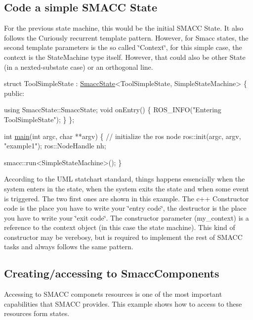 \subsection*{Code a simple S\+M\+A\+CC State}

For the previous state machine, this would be the initial S\+M\+A\+CC State. It also follows the Curiously recurrent template pattern. However, for Smacc states, the second template parameters is the so called \char`\"{}\+Context\char`\"{}, for this simple case, the context is the State\+Machine type itself. However, that could also be other State (in a nexted-\/substate case) or an orthogonal line.


\begin{DoxyCode}
\textcolor{keyword}{struct }ToolSimpleState
    : \hyperlink{classSmaccState}{SmaccState}<ToolSimpleState, SimpleStateMachine>
\{
\textcolor{keyword}{public}:

  \textcolor{keyword}{using} SmaccState::SmaccState;
  \textcolor{keywordtype}{void} onEntry()
  \{
    ROS\_INFO(\textcolor{stringliteral}{"Entering ToolSimpleState"});
  \}
\};

\textcolor{keywordtype}{int} \hyperlink{namespacerosdoc__lite_af17b2a5046f7827add27b1cc8deb06a0}{main}(\textcolor{keywordtype}{int} argc, \textcolor{keywordtype}{char} **argv) \{
  \textcolor{comment}{// initialize the ros node}
  ros::init(argc, argv, \textcolor{stringliteral}{"example1"});
  ros::NodeHandle nh;

  smacc::run<SimpleStateMachine>();
\}
\end{DoxyCode}
 According to the U\+ML statchart standard, things happens essencially when the system enters in the state, when the system exits the state and when some event is triggered. The two first ones are shown in this example. The c++ Constructor code is the place you have to write your \char`\"{}entry code\char`\"{}, the destructor is the place you have to write your \char`\"{}exit code\char`\"{}. The constructor parameter (my\+\_\+context) is a reference to the context object (in this case the state machine). This kind of constructor may be verebosy, but is required to implement the rest of S\+M\+A\+CC tasks and always follows the same pattern.

\subsection*{Creating/accessing to Smacc\+Components}

Accessing to S\+M\+A\+CC componets resources is one of the most important capabilities that S\+M\+A\+CC provides. This example shows how to access to these resources form states.

